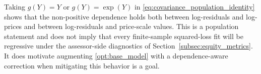 \documentclass[12pt]{article}
\theoremstyle{plain}
\theoremstyle{definition}
\newcommand{\E}{\mathbb{E}}
\newcommand{\1}{\mathbf{1}}
\newcommand{\Cov}{\text{Cov}}
\newcommand{\Var}{\text{Var}}
\begin{document}

Taking $g(Y)=Y$ or $g(Y)=\exp(Y)$ in \eqref{eq:covariance_population_identity} shows that the non-positive dependence holds both between log-residuals and log-prices and between log-residuals and price-scale values. This is a population statement and does not imply that every finite-sample squared-loss fit will be regressive under the assessor-side diagnostics of Section~\ref{subsec:equity_metrics}. It does motivate augmenting \eqref{opt:base_model} with a dependence-aware correction when mitigating this behavior is a goal.




\end{document}
